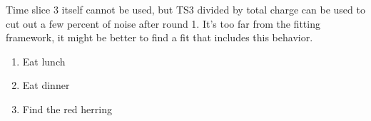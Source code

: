 
Time slice 3 itself cannot be used, but TS3 divided by total charge can be used to cut out a few percent of noise after round 1.
It's too far from the fitting framework, it might be better to find a fit that includes this behavior.




\begin{enumerate}
\item Eat lunch
\item Eat dinner
\item Find the red herring
\end{enumerate}


